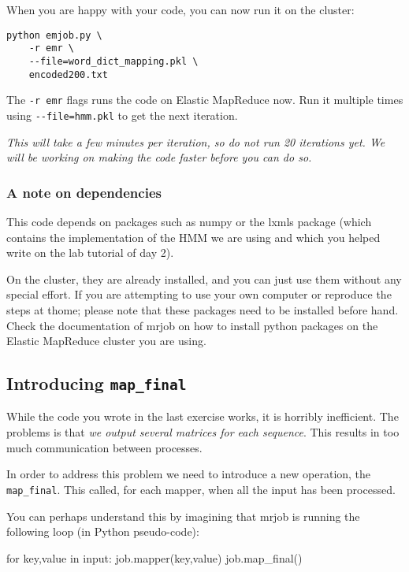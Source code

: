 When you are happy with your code, you can now run it on the cluster:

\begin{verbatim}
python emjob.py \
    -r emr \
    --file=word_dict_mapping.pkl \
    encoded200.txt
\end{verbatim}

The \verb+-r emr+ flags runs the code on Elastic MapReduce now. Run it multiple
times using \verb+--file=hmm.pkl+ to get the next iteration.

\emph{This will take a few minutes per iteration, so do not run 20 iterations
yet. We will be working on making the code faster before you can do so.}

\subsubsection{A note on dependencies}

This code depends on packages such as numpy or the lxmls package (which
contains the implementation of the HMM we are using and which you helped write
on the lab tutorial of day 2).

On the cluster, they are already installed, and you can just use them without
any special effort. If you are attempting to use your own computer or reproduce
the steps at thome; please note that these packages need to be installed before
hand. Check the documentation of mrjob on how to install python packages on the
Elastic MapReduce cluster you are using.

\subsection{Introducing \texttt{map\_final}}

While the code you wrote in the last exercise works, it is horribly
inefficient. The problems is that \emph{we output several matrices for each
sequence}. This results in too much communication between processes.

In order to address this problem we need to introduce a new operation, the
\verb+map_final+. This called, for each mapper, when all the input has been
processed.

You can perhaps understand this by imagining that mrjob is running the
following loop (in Python pseudo-code):

\begin{python}
for key,value in input:
    job.mapper(key,value)
job.map_final()
\end{python}

